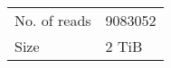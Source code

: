     \begin{tabular}{|l|l|}
        \hline
	No. of reads & \num{9083052}\\
	Size & 2 TiB\\
	\hline
    \end{tabular}

